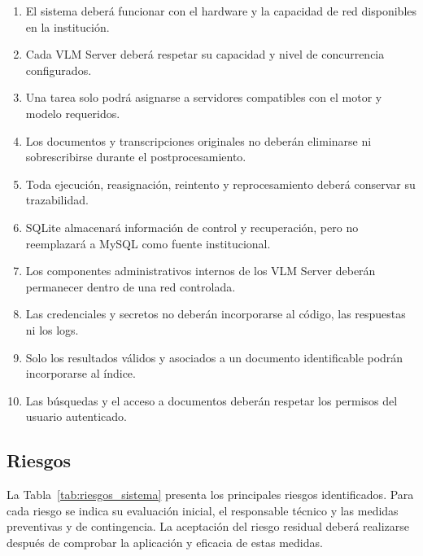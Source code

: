 \begin{enumerate}
    \item El sistema deberá funcionar con el hardware y la capacidad de red disponibles en la institución.
    \item Cada VLM Server deberá respetar su capacidad y nivel de concurrencia configurados.
    \item Una tarea solo podrá asignarse a servidores compatibles con el motor y modelo requeridos.
    \item Los documentos y transcripciones originales no deberán eliminarse ni sobrescribirse durante el postprocesamiento.
    \item Toda ejecución, reasignación, reintento y reprocesamiento deberá conservar su trazabilidad.
    \item SQLite almacenará información de control y recuperación, pero no reemplazará a MySQL como fuente institucional.
    \item Los componentes administrativos internos de los VLM Server deberán permanecer dentro de una red controlada.
    \item Las credenciales y secretos no deberán incorporarse al código, las respuestas ni los logs.
    \item Solo los resultados válidos y asociados a un documento identificable podrán incorporarse al índice.
    \item Las búsquedas y el acceso a documentos deberán respetar los permisos del usuario autenticado.
\end{enumerate}

\newpage

\subsection{Riesgos}
\label{subsec:riesgos}

La Tabla~\ref{tab:riesgos_sistema} presenta los principales riesgos identificados. Para cada riesgo se indica su evaluación inicial, el responsable técnico y las medidas preventivas y de contingencia. La aceptación del riesgo residual deberá realizarse después de comprobar la aplicación y eficacia de estas medidas.

\renewcommand{\arraystretch}{1.2}
\small

